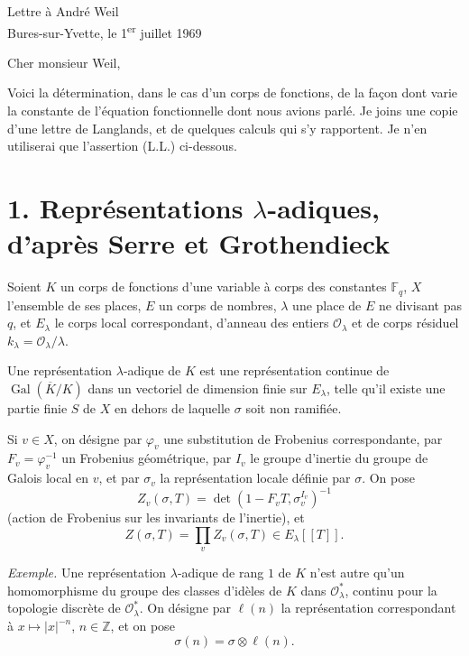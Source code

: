 \documentclass[11pt]{article}
\newcommand{\Gal}{\operatorname{Gal}}
\newcommand{\cO}{\mathcal{O}}
\newcommand{\Fq}{\mathbb{F}_q}
\newcommand{\Z}{\mathbb{Z}}
\begin{document}
\begin{center}
{\large Lettre à André Weil}\\
Bures-sur-Yvette, le 1\textsuperscript{er} juillet 1969
\end{center}

Cher monsieur Weil,

Voici la détermination, dans le cas d'un corps de fonctions, de la façon dont varie la constante de l'équation fonctionnelle dont nous avions parlé. Je joins une copie d'une lettre de Langlands, et de quelques calculs qui s'y rapportent. Je n'en utiliserai que l'assertion (L.L.) ci-dessous.

\section*{1. Représentations \(\lambda\)-adiques, d'après Serre et Grothendieck}

Soient \(K\) un corps de fonctions d'une variable à corps des constantes \(\Fq\), \(X\) l'ensemble de ses places, \(E\) un corps de nombres, \(\lambda\) une place de \(E\) ne divisant pas \(q\), et \(E_\lambda\) le corps local correspondant, d'anneau des entiers \(\cO_\lambda\) et de corps résiduel \(k_\lambda=\cO_\lambda/\lambda\).

Une représentation \(\lambda\)-adique de \(K\) est une représentation continue de \(\Gal(\overline K/K)\) dans un vectoriel de dimension finie sur \(E_\lambda\), telle qu'il existe une partie finie \(S\) de \(X\) en dehors de laquelle \(\sigma\) soit non ramifiée.

Si \(v\in X\), on désigne par \(\varphi_v\) une substitution de Frobenius correspondante, par \(F_v=\varphi_v^{-1}\) un Frobenius géométrique, par \(I_v\) le groupe d'inertie du groupe de Galois local en \(v\), et par \(\sigma_v\) la représentation locale définie par \(\sigma\). On pose
\[
Z_v(\sigma,T)=\det(1-F_vT,\sigma_v^{I_v})^{-1}
\]
(action de Frobenius sur les invariants de l'inertie), et
\[
Z(\sigma,T)=\prod_v Z_v(\sigma,T)\in E_\lambda[[T]].
\]

\emph{Exemple.} Une représentation \(\lambda\)-adique de rang \(1\) de \(K\) n'est autre qu'un homomorphisme du groupe des classes d'idèles de \(K\) dans \(\cO_\lambda^\ast\), continu pour la topologie discrète de \(\cO_\lambda^\ast\). On désigne par \(\ell(n)\) la représentation correspondant à \(x\mapsto |x|^{-n}\), \(n\in\Z\), et on pose
\[
\sigma(n)=\sigma\otimes\ell(n).
\]
\end{document}
